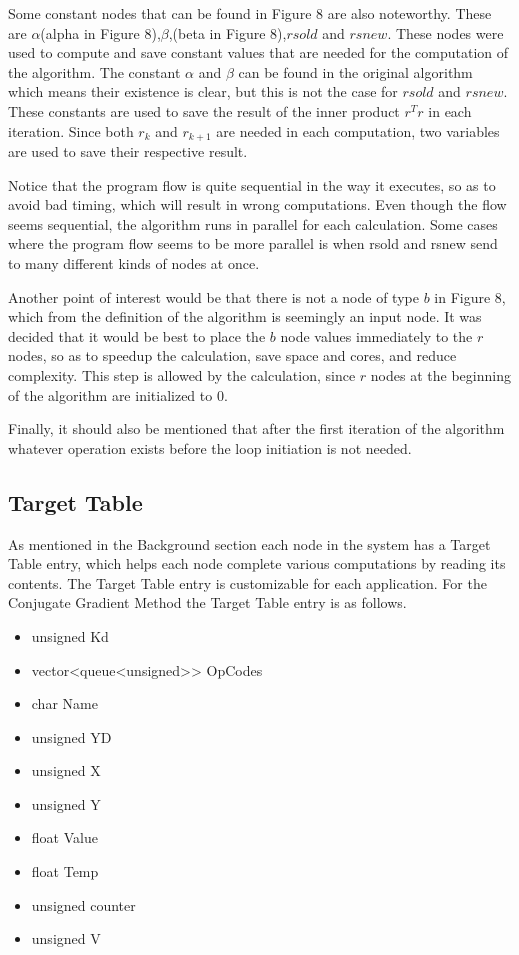 \documentclass[12pt,a4paper]{article}
\begin{document}
Some constant nodes that can be found in Figure 8 are also noteworthy. These are $\alpha$(alpha in Figure 8),$\beta$,(beta in Figure 8),$rsold$ and $rsnew$. These nodes were used to compute and save constant values that are needed for the computation of the algorithm. The constant $\alpha$ and $\beta$ can be found in the original algorithm which means their existence is clear, but this is not the case for $rsold$ and $rsnew$. These constants are used to save the result of the inner product $r^Tr$ in each iteration. Since both $r_k$ and $r_{k+1}$ are needed in each computation, two variables are used to save their respective result.

Notice that the program flow is quite sequential in the way it executes, so as to avoid bad timing, which will result in wrong computations. Even though the flow seems sequential, the algorithm runs in parallel for each calculation. Some cases where the program flow seems to be more parallel is when rsold and rsnew send to many different kinds of nodes at once.

Another point of interest would be that there is not a node of type $b$ in Figure 8, which from the definition of the algorithm is seemingly an input node. It was decided that it would be best to place the $b$ node values immediately to the $r$ nodes, so as to speedup the calculation, save space and cores, and reduce complexity. This step is allowed by the calculation, since $r$ nodes at the beginning of the algorithm are initialized to 0.

Finally, it should also be mentioned that after the first iteration of the algorithm whatever operation exists before the loop initiation is not needed.
\subsection{Target Table}
As mentioned in the Background section each node in the system has a Target Table entry, which helps each node complete various computations by reading its contents. The Target Table entry is customizable for each application. For the Conjugate Gradient Method the Target Table entry is as follows.
\begin{itemize}
\item unsigned Kd
\item vector<queue<unsigned>> OpCodes
\item char Name
\item unsigned YD
\item unsigned X
\item unsigned Y
\item float Value
\item float Temp
\item unsigned counter
\item unsigned V
\end{itemize}
\end{document}
